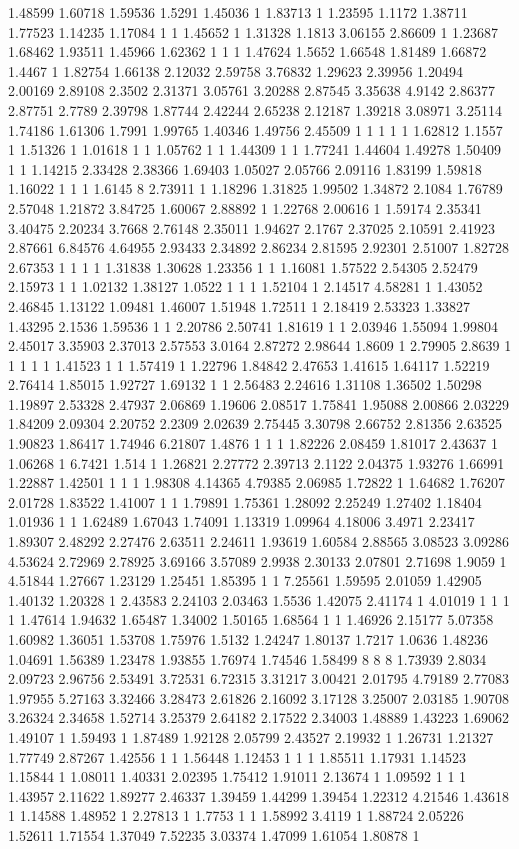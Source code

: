 1.48599 1.60718 1.59536 1.5291 1.45036 1 1.83713 1 1.23595 1.1172 1.38711 1.77523 1.14235 1.17084 1 1 1.45652 1 1.31328 1.1813 3.06155 2.86609 1 1.23687 1.68462 1.93511 1.45966 1.62362 1 1 1 1.47624 1.5652 1.66548 1.81489 1.66872 1.4467 1 1.82754 1.66138 2.12032 2.59758 3.76832 1.29623 2.39956 1.20494 2.00169 2.89108 2.3502 2.31371 3.05761 3.20288 2.87545 3.35638 4.9142 2.86377 2.87751 2.7789 2.39798 1.87744 2.42244 2.65238 2.12187 1.39218 3.08971 3.25114 1.74186 1.61306 1.7991 1.99765 1.40346 1.49756 2.45509 1 1 1 1 1 1.62812 1.1557 1 1.51326 1 1.01618 1 1 1.05762 1 1 1.44309 1 1 1.77241 1.44604 1.49278 1.50409 1 1 1.14215 2.33428 2.38366 1.69403 1.05027 2.05766 2.09116 1.83199 1.59818 1.16022 1 1 1 1.6145 8 2.73911 1 1.18296 1.31825 1.99502 1.34872 2.1084 1.76789 2.57048 1.21872 3.84725 1.60067 2.88892 1 1.22768 2.00616 1 1.59174 2.35341 3.40475 2.20234 3.7668 2.76148 2.35011 1.94627 2.1767 2.37025 2.10591 2.41923 2.87661 6.84576 4.64955 2.93433 2.34892 2.86234 2.81595 2.92301 2.51007 1.82728 2.67353 1 1 1 1 1.31838 1.30628 1.23356 1 1 1.16081 1.57522 2.54305 2.52479 2.15973 1 1 1.02132 1.38127 1.0522 1 1 1 1.52104 1 2.14517 4.58281 1 1.43052 2.46845 1.13122 1.09481 1.46007 1.51948 1.72511 1 2.18419 2.53323 1.33827 1.43295 2.1536 1.59536 1 1 2.20786 2.50741 1.81619 1 1 2.03946 1.55094 1.99804 2.45017 3.35903 2.37013 2.57553 3.0164 2.87272 2.98644 1.8609 1 2.79905 2.8639 1 1 1 1 1 1.41523 1 1 1.57419 1 1.22796 1.84842 2.47653 1.41615 1.64117 1.52219 2.76414 1.85015 1.92727 1.69132 1 1 2.56483 2.24616 1.31108 1.36502 1.50298 1.19897 2.53328 2.47937 2.06869 1.19606 2.08517 1.75841 1.95088 2.00866 2.03229 1.84209 2.09304 2.20752 2.2309 2.02639 2.75445 3.30798 2.66752 2.81356 2.63525 1.90823 1.86417 1.74946 6.21807 1.4876 1 1 1 1.82226 2.08459 1.81017 2.43637 1 1.06268 1 6.7421 1.514 1 1.26821 2.27772 2.39713 2.1122 2.04375 1.93276 1.66991 1.22887 1.42501 1 1 1 1.98308 4.14365 4.79385 2.06985 1.72822 1 1.64682 1.76207 2.01728 1.83522 1.41007 1 1 1.79891 1.75361 1.28092 2.25249 1.27402 1.18404 1.01936 1 1 1.62489 1.67043 1.74091 1.13319 1.09964 4.18006 3.4971 2.23417 1.89307 2.48292 2.27476 2.63511 2.24611 1.93619 1.60584 2.88565 3.08523 3.09286 4.53624 2.72969 2.78925 3.69166 3.57089 2.9938 2.30133 2.07801 2.71698 1.9059 1 4.51844 1.27667 1.23129 1.25451 1.85395 1 1 7.25561 1.59595 2.01059 1.42905 1.40132 1.20328 1 2.43583 2.24103 2.03463 1.5536 1.42075 2.41174 1 4.01019 1 1 1 1 1.47614 1.94632 1.65487 1.34002 1.50165 1.68564 1 1 1.46926 2.15177 5.07358 1.60982 1.36051 1.53708 1.75976 1.5132 1.24247 1.80137 1.7217 1.0636 1.48236 1.04691 1.56389 1.23478 1.93855 1.76974 1.74546 1.58499 8 8 8 1.73939 2.8034 2.09723 2.96756 2.53491 3.72531 6.72315 3.31217 3.00421 2.01795 4.79189 2.77083 1.97955 5.27163 3.32466 3.28473 2.61826 2.16092 3.17128 3.25007 2.03185 1.90708 3.26324 2.34658 1.52714 3.25379 2.64182 2.17522 2.34003 1.48889 1.43223 1.69062 1.49107 1 1.59493 1 1.87489 1.92128 2.05799 2.43527 2.19932 1 1.26731 1.21327 1.77749 2.87267 1.42556 1 1 1.56448 1.12453 1 1 1 1.85511 1.17931 1.14523 1.15844 1 1.08011 1.40331 2.02395 1.75412 1.91011 2.13674 1 1.09592 1 1 1 1.43957 2.11622 1.89277 2.46337 1.39459 1.44299 1.39454 1.22312 4.21546 1.43618 1 1.14588 1.48952 1 2.27813 1 1.7753 1 1 1.58992 3.4119 1 1.88724 2.05226 1.52611 1.71554 1.37049 7.52235 3.03374 1.47099 1.61054 1.80878 1 